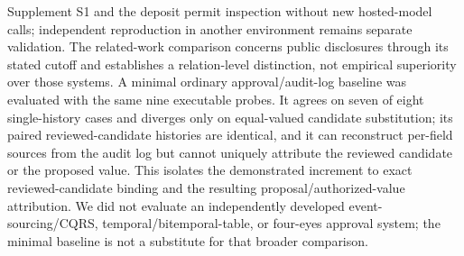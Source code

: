 Supplement S1 and the deposit permit inspection without new hosted-model calls; independent reproduction in another environment remains separate validation. The related-work comparison concerns public disclosures through its stated cutoff and establishes a relation-level distinction, not empirical superiority over those systems. A minimal ordinary approval/audit-log baseline was evaluated with the same nine executable probes. It agrees on seven of eight single-history cases and diverges only on equal-valued candidate substitution; its paired reviewed-candidate histories are identical, and it can reconstruct per-field sources from the audit log but cannot uniquely attribute the reviewed candidate or the proposed value. This isolates the demonstrated increment to exact reviewed-candidate binding and the resulting proposal/authorized-value attribution. We did not evaluate an independently developed event-sourcing/CQRS, temporal/bitemporal-table, or four-eyes approval system; the minimal baseline is not a substitute for that broader comparison.
